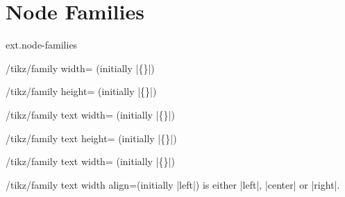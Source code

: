 %
%
%
\section{Node Families}
\begin{tikzlibrary}{ext.node-families}
\end{tikzlibrary}

\begin{key}{/tikz/family width= (initially |\{\}|)}
\end{key}

\begin{key}{/tikz/family height= (initially |\{\}|)}
\end{key}

\begin{key}{/tikz/family text width= (initially |\{\}|)}
\end{key}

\begin{key}{/tikz/family text height= (initially |\{\}|)}
\end{key}

\begin{key}{/tikz/family text width= (initially |\{\}|)}
\end{key}

\begin{key}{/tikz/family text width align=(initially |left|)}
 is either |left|, |center| or |right|.
\end{key}

\endinput